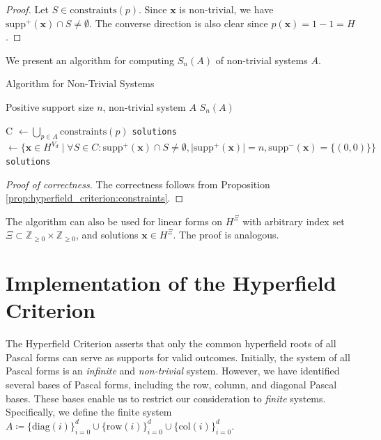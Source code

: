 \begin{proof}
    Let $S \in \mathrm{constraints}(p)$.
Since $\mathbf{x}$ is non-trivial, we have $\mathrm{supp}^+(\mathbf{x}) \cap S \neq \emptyset$. The converse direction is also clear since $p(\mathbf{x}) = 1 - 1 = H$.
\end{proof}

We present an algorithm for computing $S_{n}(A)$ of non-trivial systems $A$.

\begin{algorithm}
\caption{Algorithm for Non-Trivial Systems}\label{alg:hyperfield_criterion:efficient}
    \begin{algorithmic}[1]
    \Require Positive support size $n$, non-trivial system $A$ 
    \Ensure $S_{n}(A)$

        \State C $\gets \bigcup_{p \in A}\mathrm{constraints}(p)$
        \State \texttt{solutions} $\gets \{ \mathbf{x} \in H^{V_{d}} \mid \forall S \in C: \mathrm{supp}^+(\mathbf{\mathbf{x}}) \cap S \neq \emptyset, \vert \mathrm{supp}^+(\mathbf{x}) \vert = n,  \mathrm{supp}^-(\mathbf{x}) = \{(0,0)\}   \}$
        \State \Return \texttt{solutions}
    \EndFunction
    \end{algorithmic}  
\end{algorithm}


\begin{proof}[Proof of correctness]
The correctness follows from Proposition \ref{prop:hyperfield_criterion:constraints}.
\end{proof}

\begin{remark}\label{rem:fiuhwiu3}
    The algorithm can also be used for linear forms on \( H^{\Xi} \) with arbitrary index set \( \Xi \subset \mathbb{Z}_{\geq 0} \times \mathbb{Z}_{\geq 0} \), and solutions \( \mathbf{x} \in H^{\Xi} \). The proof is analogous.
\end{remark}

\section{Implementation of the Hyperfield Criterion}

The Hyperfield Criterion asserts that only the common hyperfield roots of all Pascal forms can serve as supports for valid outcomes. Initially, the system of all Pascal forms is an \emph{infinite} and \emph{non-trivial} system. However, we have identified several bases of Pascal forms, including the row, column, and diagonal Pascal bases. These bases enable us to restrict our consideration to \emph{finite} systems. Specifically, we define the finite system \( A \coloneqq \{ \mathrm{diag}(i) \}_{i=0}^d \cup \{ \mathrm{row}(i)\}^d_{i=0} \cup \{ \mathrm{col}(i) \}^d_{i=0} \).

